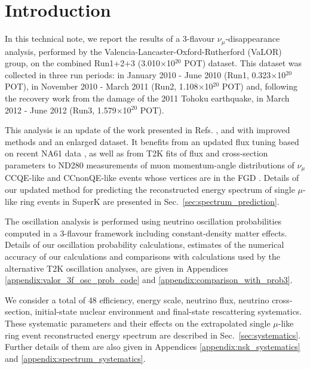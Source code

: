 \clearpage

\section {Introduction }
\label{sec:intro}

In this technical note, 
we report the results of a 3-flavour $\nu_{\mu}$-disappearance analysis,
performed by the Valencia-Lancaster-Oxford-Rutherford (VaLOR) group,        
on the combined Run1+2+3 (3.010$\times$10$^{20}$ POT) dataset.
This dataset was collected in three run periods:
in January 2010 - June 2010 (Run1, 0.323$\times$10$^{20}$ POT),
in November 2010 - March 2011 (Run2, 1.108$\times$10$^{20}$ POT) and,
following the recovery work from the damage of the 2011 Tohoku earthquake, 
in March 2012 - June 2012 (Run3, 1.579$\times$10$^{20}$ POT).

This analysis is an update of the work presented in
Refs. \cite{OurRun1DisappAnalysis}, \cite{OurRun12DisappAnalysis} and \cite{OurRun12DisappAnalysis3Flavour}
with improved methods and an enlarged dataset. It benefits from an updated flux tuning based on
recent NA61 data \cite{FluxTuning}\cite{NA61T2K}, as well as from T2K fits of flux and cross-section parameters to
ND280 measurements of muon momentum-angle distributions of $\nu_\mu$ CCQE-like and CCnonQE-like events whose 
vertices are in the FGD \cite{BANFF}.
Details of our updated method for predicting the reconstructed energy spectrum 
of single $\mu$-like ring events in SuperK are presented in Sec.\ \ref{sec:spectrum_prediction}.

The oscillation analysis is performed using neutrino oscillation probabilities computed in a 3-flavour
framework including constant-density matter effects. 
Details of our oscillation probability calculations, estimates of the numerical accuracy of our
calculations and comparisons with calculations used by the alternative T2K oscillation analyses, 
are given in Appendices \ref{appendix:valor_3f_osc_prob_code} and \ref{appendix:comparison_with_prob3}.

We consider a total of 48 efficiency, energy scale, neutrino flux, neutrino cross-section, 
initial-state nuclear environment and final-state rescattering systematics. 
These systematic parameters and their effects 
on the extrapolated single $\mu$-like ring event reconstructed energy spectrum are described in Sec.\ \ref{sec:systematics}.
Further details of them are also given in Appendices \ref{appendix:nsk_systematics} and \ref{appendix:spectrum_systematics}.

